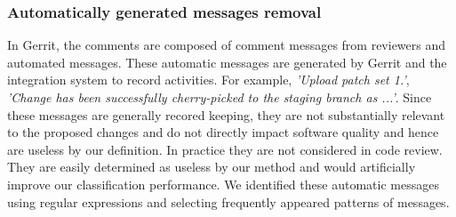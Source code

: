 \subsubsection{Automatically generated messages removal}
In Gerrit, the comments are composed of comment messages from reviewers and automated messages. These automatic messages are generated by Gerrit and the integration system to record activities. For example, \textit{'Upload patch set 1.'}, \textit{'Change has been successfully cherry-picked to the staging branch as ...'}. Since these messages are generally recored keeping, they are not substantially relevant to the proposed changes and do not directly impact software quality\cite{Mcintosh} and hence are useless by our definition. In practice they are not considered in code review. They are easily determined as useless by our method and would artificially improve our classification performance. We identified these automatic messages using regular expressions and selecting frequently appeared patterns of messages.  






%
%
%



